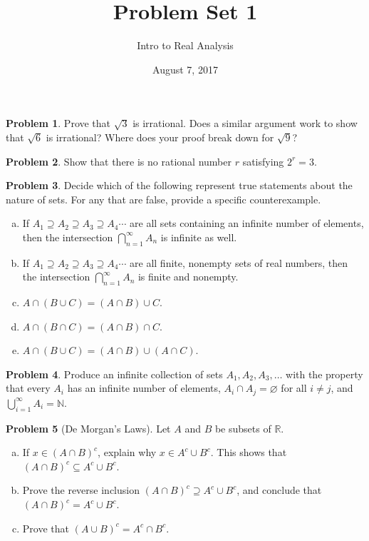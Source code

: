 \documentclass{amsart}
\newcommand{\+}[1]{\ensuremath{\mathbf{#1}}}
\newcommand{\R}{{\mathbb R}}
\renewcommand{\emptyset}{\varnothing}
\theoremstyle{definition}
\newtheorem{prob}{Problem}
\begin{document}
\title{Problem Set 1}
\date{August 7, 2017}
\author{Intro to Real Analysis}

\maketitle


\begin{prob}
 Prove that $\sqrt{3}$ is irrational.  Does
  a similar argument work to show that $\sqrt{6}$ is irrational?
  Where does your proof break down for $\sqrt{9}$?
\end{prob}

\begin{prob}
 Show that there is no rational number $r$ satisfying $2^r = 3$.
\end{prob}

\begin{prob}
 Decide which of the following represent true statements
 about the nature of sets.  For any that are false, provide
 a specific counterexample.
 \begin{enumerate}[(a)]
  \item If $A_1 \supseteq A_2 \supseteq A_3 \supseteq A_4 \cdots$
  are all sets containing an infinite number of elements,
  then the intersection $\bigcap^{\infty}_{n=1}A_n$ is infinite as well.
  \item If $A_1 \supseteq A_2 \supseteq A_3 \supseteq A_4 \cdots$
  are all finite, nonempty sets of real numbers,
  then the intersection $\bigcap^{\infty}_{n=1}A_n$ is finite and nonempty.
  \item $A \cap (B \cup C) = (A \cap B) \cup C$.
  \item $A \cap (B \cap C) = (A \cap B) \cap C$.
  \item $A \cap (B \cup C) = (A \cap B) \cup (A \cap C)$.
 \end{enumerate}
\end{prob}

\begin{prob}
 Produce an infinite collection of sets $A_1, A_2, A_3, \ldots$
 with the property that every $A_i$ has an infinite number of
 elements, $A_i \cap A_j = \emptyset$ for all $i \neq j$,
 and $\bigcup^{\infty}_{i=1} A_i = \mathbb{N}$.
\end{prob}


\begin{prob}[De Morgan's Laws]
 Let $A$ and $B$ be subsets of $\R$.
 \begin{enumerate}[(a)]
  \item If $x \in (A \cap B)^c$, explain why
  $x \in A^c \cup B^c$.  This shows that 
  $(A \cap B)^c \subseteq A^c \cup B^c$.
  \item Prove the reverse inclusion
  $(A \cap B)^c \supseteq A^c \cup B^c$, 
  and conclude that $(A \cap B)^c = A^c \cup B^c$.
  \item Prove that $(A \cup B)^c = A^c \cap B^c$.
 \end{enumerate}
\end{prob}
\end{document}

